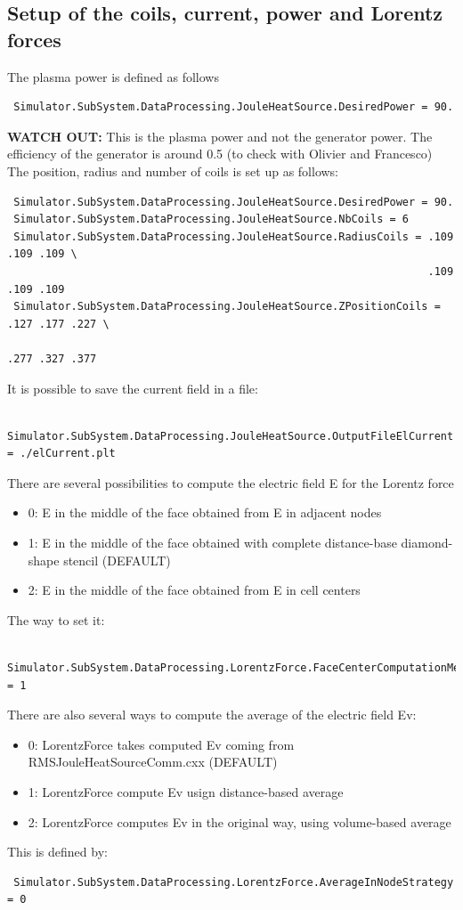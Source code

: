 \documentclass[11pt]{article}
\begin{document}
\subsection{Setup of the coils, current, power and Lorentz forces}
The plasma power is defined as follows
\begin{verbatim}
 Simulator.SubSystem.DataProcessing.JouleHeatSource.DesiredPower = 90.
\end{verbatim}
{\bf WATCH OUT:} This is the plasma power and not the generator power. The efficiency of the
generator is around 0.5 (to check with Olivier and Francesco)
The position, radius and number of coils is set up as follows:
\begin{verbatim}
 Simulator.SubSystem.DataProcessing.JouleHeatSource.DesiredPower = 90.
 Simulator.SubSystem.DataProcessing.JouleHeatSource.NbCoils = 6
 Simulator.SubSystem.DataProcessing.JouleHeatSource.RadiusCoils = .109 .109 .109 \
                                                                  .109 .109 .109
 Simulator.SubSystem.DataProcessing.JouleHeatSource.ZPositionCoils = .127 .177 .227 \
                                                                     .277 .327 .377
\end{verbatim}
It is possible to save the current field in a file:
\begin{verbatim}
  Simulator.SubSystem.DataProcessing.JouleHeatSource.OutputFileElCurrent = ./elCurrent.plt
\end{verbatim}


There are several possibilities to compute the electric field E for the Lorentz force
\begin{itemize}
 \item 0: E in the middle of the face obtained from E in adjacent nodes 
 \item 1: E in the middle of the face obtained with complete distance-base diamond-shape stencil (DEFAULT)
 \item 2: E in the middle of the face obtained from E in cell centers
\end{itemize}
The way to set it:
\begin{verbatim}
 Simulator.SubSystem.DataProcessing.LorentzForce.FaceCenterComputationMethod = 1
\end{verbatim}

There are also several ways to compute the average of the electric field Ev:
\begin{itemize}
 \item 0: LorentzForce takes computed Ev coming from RMSJouleHeatSourceComm.cxx (DEFAULT)
 \item 1: LorentzForce compute Ev usign distance-based average 
 \item 2: LorentzForce computes Ev in the original way, using volume-based average
\end{itemize}
This is defined by:
\begin{verbatim}
 Simulator.SubSystem.DataProcessing.LorentzForce.AverageInNodeStrategy = 0
\end{verbatim}
\end{document}
